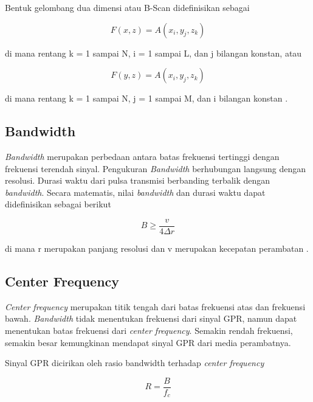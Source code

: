 Bentuk gelombang dua dimensi atau B-Scan didefinisikan sebagai

\begin{equation}
  \label{eq:Bscanx}
  F(x,z)=A( x_{i} , y_{j} , z_{k} )
\end{equation}

di mana rentang k = 1 sampai N, i = 1 sampai L, dan j bilangan konstan, atau

\begin{equation}
  \label{eq:Bscany}
  F(y,z)=A( x_{i} , y_{j} , z_{k} )
\end{equation}

di mana rentang k = 1 sampai N, j = 1 sampai M, dan i bilangan konstan \parencite{danielDvd}.

\subsection{Bandwidth}
\label{subsec:bandwidth}

\emph{Bandwidth} merupakan perbedaan antara batas frekuensi tertinggi dengan frekuensi terendah sinyal. 
Pengukuran \emph{Bandwidth} berhubungan langsung dengan resolusi. 
Durasi waktu dari pulsa transmisi berbanding terbalik dengan \emph{bandwidth}. 
Secara matematis, nilai \emph{bandwidth} dan durasi waktu dapat didefinisikan sebagai berikut

\begin{equation}
  \label{eq:BW}
  B \geq  \frac{v}{4 \Delta r} 
\end{equation}

di mana r merupakan panjang resolusi dan v merupakan kecepatan perambatan \parencite{jol2008ground}.

\subsection{Center Frequency}
\label{subsec:centerFrequency}

\emph{Center frequency} merupakan titik tengah dari batas frekuensi atas dan frekuensi bawah. 
\emph{Bandwidth} tidak menentukan frekuensi dari sinyal GPR, namun dapat menentukan batas frekuensi dari \emph{center frequency}.
Semakin rendah frekuensi, semakin besar kemungkinan mendapat sinyal GPR dari media perambatnya.

Sinyal GPR dicirikan oleh rasio bandwidth terhadap \emph{center frequency}

\begin{equation}
  \label{eq:cF}
  R =  \frac{B}{ f_{c} } 
\end{equation}


